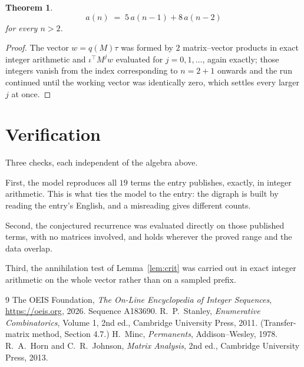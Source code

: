 \documentclass[11pt,a4paper]{article}
\theoremstyle{plain}
\newtheorem{theorem}{Theorem}
\theoremstyle{definition}
\begin{document}
\begin{theorem}
\[
a(n)\;=\;5\,a(n-1) + 8\,a(n-2)
\]
for every $n>2$.
\end{theorem}

\begin{proof}
The vector $w=q(M)\tau$ was formed by $2$ matrix--vector products in exact integer
arithmetic and $\iota^{\!\top}M^{j}w$ evaluated for $j=0,1,\dots$, again exactly; those
integers vanish from the index corresponding to $n=2+1$ onwards and the run continued
until the working vector was identically zero, which settles every larger $j$ at once.
\end{proof}

\section{Verification}

Three checks, each independent of the algebra above.

First, the model reproduces all $19$ terms the entry publishes, exactly, in integer
arithmetic. This is what ties the model to the entry: the digraph is built by reading the
entry's English, and a misreading gives different counts.

Second, the conjectured recurrence was evaluated directly on those published terms, with no
matrices involved, and holds wherever the proved range and the data overlap.

Third, the annihilation test of Lemma~\ref{lem:crit} was carried out in exact integer
arithmetic on the whole vector rather than on a sampled prefix.

\begin{thebibliography}{9}
 The OEIS Foundation, \emph{The On-Line Encyclopedia of Integer
Sequences}, \url{https://oeis.org}, 2026. Sequence A183690.
 R.~P.~Stanley, \emph{Enumerative Combinatorics}, Volume 1, 2nd ed.,
Cambridge University Press, 2011. (Transfer-matrix method, Section 4.7.)
 H.~Minc, \emph{Permanents}, Addison--Wesley, 1978.
 R.~A.~Horn and C.~R.~Johnson, \emph{Matrix Analysis}, 2nd ed., Cambridge
University Press, 2013.
\end{thebibliography}
\end{document}
